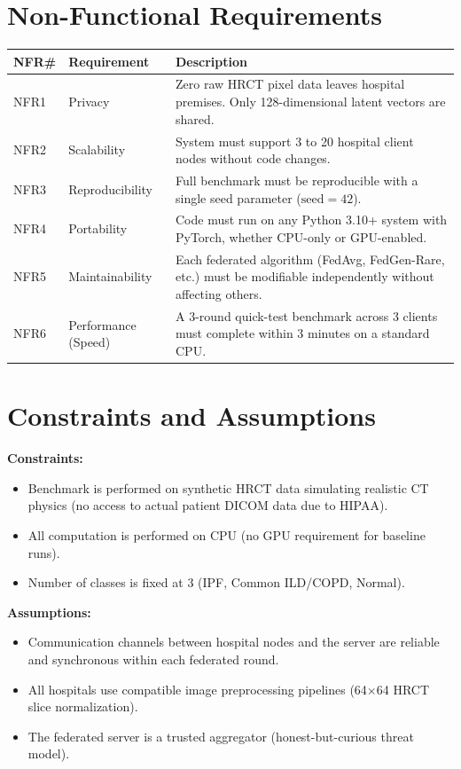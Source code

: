 \documentclass[12pt,a4paper]{report}
\begin{document}
\section{Non-Functional Requirements}
\begin{longtable}{|p{0.5cm}|p{4cm}|p{9cm}|}
    \hline
    \textbf{NFR\#} & \textbf{Requirement} & \textbf{Description} \\
    \hline
    NFR1 & Privacy & Zero raw HRCT pixel data leaves hospital premises. Only 128-dimensional latent vectors are shared. \\
    \hline
    NFR2 & Scalability & System must support 3 to 20 hospital client nodes without code changes. \\
    \hline
    NFR3 & Reproducibility & Full benchmark must be reproducible with a single seed parameter ($\text{seed}=42$). \\
    \hline
    NFR4 & Portability & Code must run on any Python 3.10+ system with PyTorch, whether CPU-only or GPU-enabled. \\
    \hline
    NFR5 & Maintainability & Each federated algorithm (FedAvg, FedGen-Rare, etc.) must be modifiable independently without affecting others. \\
    \hline
    NFR6 & Performance (Speed) & A 3-round quick-test benchmark across 3 clients must complete within 3 minutes on a standard CPU. \\
    \hline
\end{longtable}

\section{Constraints and Assumptions}
\textbf{Constraints:}
\begin{itemize}
    \item Benchmark is performed on synthetic HRCT data simulating realistic CT physics (no access to actual patient DICOM data due to HIPAA).
    \item All computation is performed on CPU (no GPU requirement for baseline runs).
    \item Number of classes is fixed at 3 (IPF, Common ILD/COPD, Normal).
\end{itemize}

\textbf{Assumptions:}
\begin{itemize}
    \item Communication channels between hospital nodes and the server are reliable and synchronous within each federated round.
    \item All hospitals use compatible image preprocessing pipelines (64$\times$64 HRCT slice normalization).
    \item The federated server is a trusted aggregator (honest-but-curious threat model).
\end{itemize}
\end{document}

